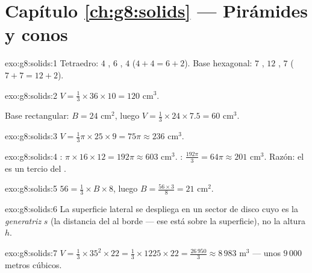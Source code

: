 \section*{Capítulo \ref{ch:g8:solids} --- Pirámides y conos}

\begin{solution}{exo:g8:solids:1}
Tetraedro: $4$ , $6$ , $4$ 
($4 + 4 = 6 + 2$). Base hexagonal: $7$ , $12$ , $7$
 ($7 + 7 = 12 + 2$).
\end{solution}

\begin{solution}{exo:g8:solids:2}
$V = \frac13 \times 36 \times 10 = 120$ cm$^3$.

Base rectangular: $B = 24$ cm$^2$, luego
$V = \frac13 \times 24 \times 7.5 = 60$ cm$^3$.
\end{solution}

\begin{solution}{exo:g8:solids:3}
$V = \frac13 \pi \times 25 \times 9 = 75\pi \approx 236$ cm$^3$.
\end{solution}

\begin{solution}{exo:g8:solids:4}
: $\pi \times 16 \times 12 = 192\pi \approx 603$ cm$^3$.
: $\frac{192\pi}{3} = 64\pi \approx 201$ cm$^3$. Razón: el 
es un tercio del .
\end{solution}

\begin{solution}{exo:g8:solids:5}
$56 = \frac13 \times B \times 8$, luego $B = \frac{56 \times 3}{8} = 21$
cm$^2$.
\end{solution}

\begin{solution}{exo:g8:solids:6}
La superficie lateral se despliega en un sector de disco cuyo  es la
\emph{generatriz} $s$ (la distancia del  al borde ---
ese  está sobre la superficie), no la altura $h$.
\end{solution}

\begin{solution}{exo:g8:solids:7}
$V = \frac13 \times 35^2 \times 22 = \frac13 \times 1225 \times 22
= \frac{26\,950}{3} \approx 8\,983$ m$^3$ --- unos $9\,000$ metros
cúbicos.
\end{solution}

